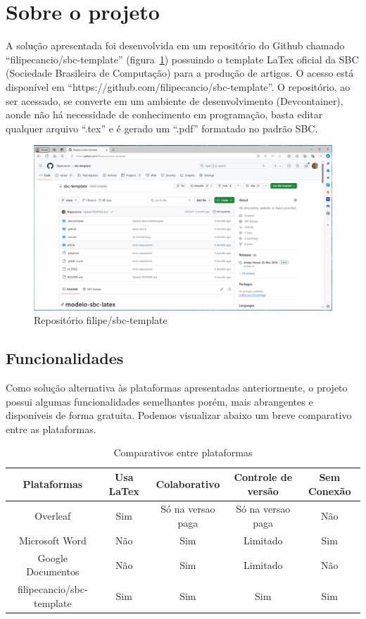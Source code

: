 \section{Sobre o projeto}

A solução apresentada foi desenvolvida em um repositório do Github chamado ``filipecancio/sbc-template'' (figura~\ref{fig:fig10}) possuindo o template LaTex oficial da SBC (Sociedade Brasileira de Computação) para a produção de artigos. O acesso está disponível em ``https://github.com/filipecancio/sbc-template''. O repositório, ao ser acessado, se converte em um ambiente de desenvolvimento (Devcontainer), aonde não há necessidade de conhecimento em programação, basta editar qualquer arquivo ``.tex'' e é gerado um ``.pdf'' formatado no padrão SBC.

\begin{figure}[ht]
	\centering
	\includegraphics[width=.7\textwidth]{./images/fig10.png}
	\caption{Repositório filipe/sbc-template}
	\label{fig:fig10}
\end{figure}

\subsection{Funcionalidades}

Como solução alternativa às plataformas apresentadas anteriormente, o projeto possui algumas funcionalidades semelhantes porém, mais abrangentes e disponíveis de forma gratuita. Podemos visualizar abaixo um breve comparativo entre as plataformas.

\begin{table}[ht]
	\centering
	\begin{tabular}{|c|c|c|c|c|}
		\hline
		Plataformas & Usa LaTex & Colaborativo & Controle de versão & Sem Conexão
		\\
		\hline
		Overleaf & Sim & Só na versao paga & Só na versao paga & Não \\
		\hline
		Microsoft Word & Não & Sim & Limitado & Sim \\
		\hline
		Google Documentos & Não & Sim & Limitado & Não \\
		\hline
		filipecancio/sbc-template & Sim & Sim & Sim & Sim \\
		\hline
	\end{tabular}
	\caption{Comparativos entre plataformas}
	\label{tab:tabela01}
\end{table}

